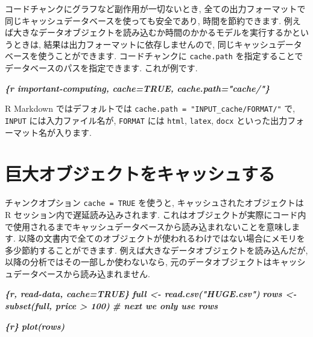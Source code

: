 \documentclass[
  11pt,
]{bxjsreport}
\newenvironment{Shaded}{\begin{snugshade}}{\end{snugshade}}
\newcommand{\InformationTok}[1]{\textcolor[rgb]{0.56,0.35,0.01}{\textbf{\textit{#1}}}}
\begin{document}
コードチャンクにグラフなど副作用が一切ないとき, 全ての出力フォーマットで同じキャッシュデータベースを使っても安全であり, 時間を節約できます. 例えば大きなデータオブジェクトを読み込むか時間のかかるモデルを実行するかというときは, 結果は出力フォーマットに依存しませんので, 同じキャッシュデータベースを使うことができます. コードチャンクに \texttt{cache.path} を指定することでデータベースのパスを指定できます. これが例です.

\begin{Shaded}
\begin{Highlighting}[]
\InformationTok{\textasciigrave{}\textasciigrave{}\textasciigrave{}\{r important{-}computing, cache=TRUE, cache.path="cache/"\}}
\InformationTok{\textasciigrave{}\textasciigrave{}\textasciigrave{}}
\end{Highlighting}
\end{Shaded}

R Markdown ではデフォルトでは \texttt{cache.path = "INPUT\_cache/FORMAT/"} で, \texttt{INPUT} には入力ファイル名が, \texttt{FORMAT} には \texttt{html}, \texttt{latex}, \texttt{docx} といった出力フォーマット名が入ります.

\hypertarget{cache-lazy}{%
\section{巨大オブジェクトをキャッシュする}\label{cache-lazy}}

チャンクオプション \texttt{cache = TRUE} を使うと, キャッシュされたオブジェクトは R セッション内で遅延読み込みされます. これはオブジェクトが実際にコード内で使用されるまでキャッシュデータベースから読み込まれないことを意味します. 以降の文書内で全てのオブジェクトが使われるわけではない場合にメモリを多少節約することができます. 例えば大きなデータオブジェクトを読み込んだが, 以降の分析ではその一部しか使わないなら, 元のデータオブジェクトはキャッシュデータベースから読み込まれません.

\begin{Shaded}
\begin{Highlighting}[]
\InformationTok{\textasciigrave{}\textasciigrave{}\textasciigrave{}\{r, read{-}data, cache=TRUE\}}
\InformationTok{full \textless{}{-} read.csv("HUGE.csv")}
\InformationTok{rows \textless{}{-} subset(full, price \textgreater{} 100)}
\InformationTok{\# next we only use \textasciigrave{}rows\textasciigrave{}}
\InformationTok{\textasciigrave{}\textasciigrave{}\textasciigrave{}}

\InformationTok{\textasciigrave{}\textasciigrave{}\textasciigrave{}\{r\}}
\InformationTok{plot(rows)}
\InformationTok{\textasciigrave{}\textasciigrave{}\textasciigrave{}}
\end{Highlighting}
\end{Shaded}
\end{document}
